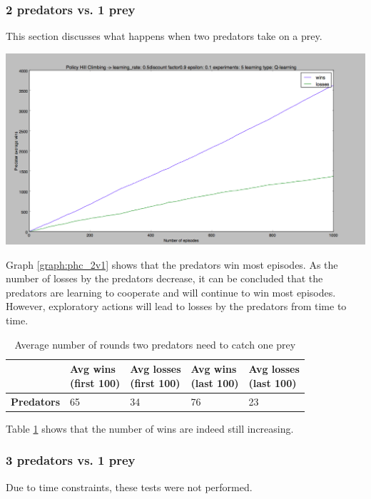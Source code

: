 \subsubsection{2 predators vs. 1 prey}
This section discusses what happens when two predators take on a prey.

\begin{center}
	\includegraphics[scale=0.3]{hillclimbing1000times5step01}
	\label{graph:phc_2v1}
\end{center}

Graph \ref{graph:phc_2v1} shows that the predators win most episodes. As the number of losses by the predators decrease, it can be concluded that the predators are learning to cooperate and will continue to win most episodes. However, exploratory actions will lead to losses by the predators from time to time.

\begin{table}[H]
\begin{center}
\begin{tabular}{| l | l | l | l | l |}
\hline
 & \parbox{2cm}{\textbf{Avg wins \\ (first 100)}} & \parbox{2cm}{\textbf{Avg losses \\ (first 100)}} & \parbox{2cm}{\textbf{Avg wins \\ (last 100)}} & \parbox{2cm}{\textbf{Avg losses \\ (last 100)}} \\
\hline
\textbf{Predators} & 65 & 34 & 76 & 23 \\
\hline
\end{tabular}
\caption{Average number of rounds two predators need to catch one prey}
\label{table:2vs1}
\end{center}
\end{table}

Table \ref{table:2vs1} shows that the number of wins are indeed still increasing.

\subsubsection{3 predators vs. 1 prey}
Due to time constraints, these tests were not performed.